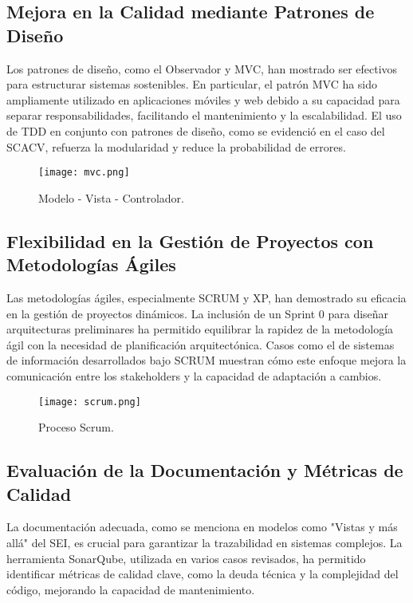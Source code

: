 \documentclass[conference]{IEEEtran}
\begin{document}
\subsection{Mejora en la Calidad mediante Patrones de Diseño}
Los patrones de diseño, como el Observador y MVC, han
mostrado ser efectivos para estructurar sistemas sostenibles. En particular, el patrón MVC ha sido ampliamente utilizado en
aplicaciones móviles y web debido a su capacidad para separar
responsabilidades, facilitando el mantenimiento y la
escalabilidad. El uso de TDD en conjunto con patrones de
diseño, como se evidenció en el caso del SCACV, refuerza la
modularidad y reduce la probabilidad de errores.

\begin{figure}[H] %
    \centering
    \texttt{[image: mvc.png]} %
    \caption{Modelo - Vista - Controlador.}
    \label{fig:etiqueta-imagen} %
\end{figure}

\subsection{Flexibilidad en la Gestión de Proyectos con Metodologías Ágiles}
Las metodologías ágiles, especialmente SCRUM y XP, han
demostrado su eficacia en la gestión de proyectos dinámicos.
La inclusión de un Sprint 0 para diseñar arquitecturas
preliminares ha permitido equilibrar la rapidez de la
metodología ágil con la necesidad de planificación
arquitectónica. Casos como el de sistemas de información
desarrollados bajo SCRUM muestran cómo este enfoque
mejora la comunicación entre los stakeholders y la capacidad
de adaptación a cambios.

\begin{figure}[H] %
    \centering
    \texttt{[image: scrum.png]} %
    \caption{Proceso Scrum.}
    \label{fig:etiqueta-imagen} %
\end{figure}

\subsection{Evaluación de la Documentación y Métricas de Calidad}
La documentación adecuada, como se menciona en modelos como "Vistas y más allá" del SEI, es crucial para garantizar la trazabilidad en sistemas complejos. La herramienta SonarQube, utilizada en varios casos revisados, ha permitido identificar métricas de calidad clave, como la deuda técnica y la complejidad del código, mejorando la capacidad de mantenimiento.\\
\end{document}

